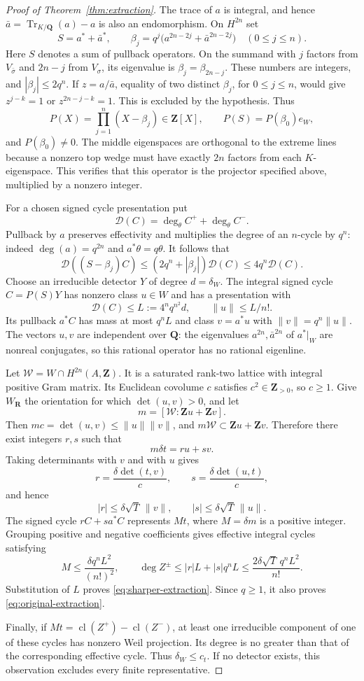 \documentclass[11pt]{article}
\theoremstyle{definition}
\theoremstyle{remark}
\newcommand{\Q}{\mathbf Q}
\newcommand{\Z}{\mathbf Z}
\newcommand{\R}{\mathbf R}
\newcommand{\cl}{\operatorname{cl}}
\begin{document}
\begin{proof}[Proof of Theorem~\ref{thm:extraction}]
The trace of $a$ is integral, and hence $\bar a=\operatorname{Tr}_{K/\Q}(a)-a$ is also an endomorphism. On $H^{2n}$ set
\[
 S=a^*+\bar a^*,\qquad
 \beta_j=q^j\bigl(a^{2n-2j}+\bar a^{2n-2j}\bigr)
 \quad(0\leq j\leq n).
\]
Here $S$ denotes a sum of pullback operators. On the summand with $j$ factors from $V_{\bar\sigma}$ and $2n-j$ from $V_\sigma$, its eigenvalue is $\beta_j=\beta_{2n-j}$. These numbers are integers, and $|\beta_j|\leq2q^n$. If $z=a/\bar a$, equality of two distinct $\beta_j$, for $0\leq j\leq n$, would give $z^{j-k}=1$ or $z^{2n-j-k}=1$. This is excluded by the hypothesis. Thus
\[
 P(X)=\prod_{j=1}^n(X-\beta_j)\in\Z[X],\qquad
 P(S)=P(\beta_0)e_W,
\]
and $P(\beta_0)\ne0$. The middle eigenspaces are orthogonal to the extreme lines because a nonzero top wedge must have exactly $2n$ factors from each $K$-eigenspace. This verifies that this operator is the projector specified above, multiplied by a nonzero integer.

For a chosen signed cycle presentation put
\[
 \mathcal D(C)=\deg_\theta C^++\deg_\theta C^-.
\]
Pullback by $a$ preserves effectivity and multiplies the degree of an $n$-cycle by $q^n$: indeed $\deg(a)=q^{2n}$ and $a^*\theta=q\theta$. It follows that
\[
 \mathcal D((S-\beta_j)C)
 \leq(2q^n+|\beta_j|)\mathcal D(C)
 \leq4q^n\mathcal D(C).
\]
Choose an irreducible detector $Y$ of degree $d=\delta_W$. The integral signed cycle $C=P(S)Y$ has nonzero class $u\in W$ and has a presentation with
\[
 \mathcal D(C)\leq L:=4^nq^{n^2}d,
 \qquad \|u\|\leq L/n!.
\]
Its pullback $a^*C$ has mass at most $q^nL$ and class $v=a^*u$ with $\|v\|=q^n\|u\|$. The vectors $u,v$ are independent over $\Q$: the eigenvalues $a^{2n},\bar a^{2n}$ of $a^*|_W$ are nonreal conjugates, so this rational operator has no rational eigenline.

Let $\mathcal W=W\cap H^{2n}(A,\Z)$. It is a saturated rank-two lattice with integral positive Gram matrix. Its Euclidean covolume $c$ satisfies $c^2\in\Z_{>0}$, so $c\geq1$. Give $W_\R$ the orientation for which $\det(u,v)>0$, and let
\[
 m=[\mathcal W:\Z u+\Z v].
\]
Then $mc=\det(u,v)\leq\|u\|\|v\|$, and $m\mathcal W\subset\Z u+\Z v$. Therefore there exist integers $r,s$ such that
\[
 m\delta t=ru+sv.
\]
Taking determinants with $v$ and with $u$ gives
\[
 r=\frac{\delta\det(t,v)}c,\qquad
 s=\frac{\delta\det(u,t)}c,
\]
and hence
\[
 |r|\leq\delta\sqrt T\,\|v\|,
 \qquad |s|\leq\delta\sqrt T\,\|u\|.
\]
The signed cycle $rC+s a^*C$ represents $M t$, where $M=\delta m$ is a positive integer. Grouping positive and negative coefficients gives effective integral cycles satisfying
\[
 M\leq\frac{\delta q^nL^2}{(n!)^2},\qquad
 \deg Z^\pm\leq|r|L+|s|q^nL
 \leq\frac{2\delta\sqrt T\,q^nL^2}{n!}.
\]
Substitution of $L$ proves \eqref{eq:sharper-extraction}. Since $q\geq1$, it also proves \eqref{eq:original-extraction}.

Finally, if $Mt=\cl(Z^+)-\cl(Z^-)$, at least one irreducible component of one of these cycles has nonzero Weil projection. Its degree is no greater than that of the corresponding effective cycle. Thus $\delta_W\leq c_t$. If no detector exists, this observation excludes every finite representative.
\end{proof}
\end{document}
